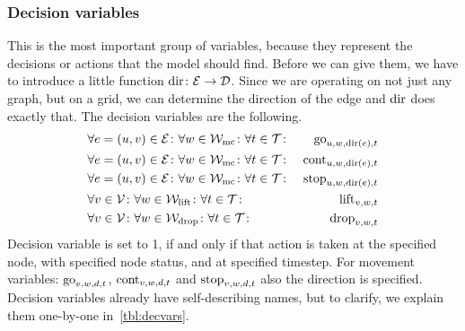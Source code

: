 \subsubsection{Decision variables}
This is the most important group of variables, because they represent the
decisions or actions that the model should find. Before we can give them, we
have to introduce a little function $\mathrm{dir} \colon \mathcal{E} \to \mathcal{D}$. Since we are
operating on not just any graph, but on a grid, we can determine the direction
of the edge and $\mathrm{dir}$ does exactly that. The decision variables are the
following.
\begin{align}
    &\forall e=(u,v) \in \mathcal{E} \colon \forall w \in \mathcal{W}_\mathrm{mc} \colon \forall t \in \mathcal{T} \colon
    & \mathrm{go}_{u,w,\mathrm{dir}(e),t}\\
    &\forall e=(u,v) \in \mathcal{E} \colon \forall w \in \mathcal{W}_\mathrm{mc} \colon \forall t \in \mathcal{T}
    \colon & \mathrm{cont}_{u,w,\mathrm{dir}(e),t}\\
    &\forall e=(u,v) \in \mathcal{E} \colon \forall w \in \mathcal{W}_\mathrm{mc} \colon \forall t \in \mathcal{T}
    \colon & \mathrm{stop}_{u,w,\mathrm{dir}(e),t}\\
    &\forall v \in \mathcal{V} \colon \forall w \in \mathcal{W}_\mathrm{lift} \colon \forall t \in \mathcal{T} \colon &
    \mathrm{lift}_{v,w,t}\\
    &\forall v \in \mathcal{V} \colon \forall w \in \mathcal{W}_\mathrm{drop} \colon \forall t \in \mathcal{T} \colon &
    \mathrm{drop}_{v,w,t}
\end{align}
Decision variable is set to 1, if and only if that action is taken at the
specified node, with specified node status, and at specified timestep. For
movement variables: $\mathrm{go}_{v,w,d,t}$, $\mathrm{cont}_{v,w,d,t}$ and $\mathrm{stop}_{v,w,d,t}$
also the direction is specified. Decision variables already have
self-describing names, but to clarify, we explain them one-by-one
in~\autoref{tbl:decvars}.


